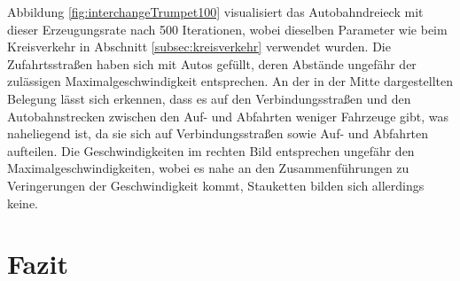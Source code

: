 \documentclass[10pt, a4paper]{article}
\newcommand\myref[1]{\ref{#1} (S. \pageref{#1})}
\newcommand\myrefcomma[1]{\ref{#1}, S. \pageref{#1}}
\begin{document}
Abbildung \ref{fig:interchangeTrumpet100} visualisiert das Autobahndreieck mit dieser Erzeugungsrate nach 500 Iterationen, wobei dieselben Parameter wie beim Kreisverkehr in Abschnitt \ref{subsec:kreisverkehr} verwendet wurden. Die Zufahrtsstraßen haben sich mit Autos gefüllt, deren Abstände ungefähr der zulässigen Maximalgeschwindigkeit entsprechen. An der in der Mitte dargestellten Belegung lässt sich erkennen, dass es auf den Verbindungsstraßen und den Autobahnstrecken zwischen den Auf- und Abfahrten weniger Fahrzeuge gibt, was naheliegend ist, da sie sich auf Verbindungsstraßen sowie Auf- und Abfahrten aufteilen. Die Geschwindigkeiten im rechten Bild entsprechen ungefähr den Maximalgeschwindigkeiten, wobei es nahe an den Zusammenführungen zu Veringerungen der Geschwindigkeit kommt, Stauketten bilden sich allerdings keine.

\newpage
\section{Fazit}
\label{sec:fazit}

\blindtext
\blindtext
\blindtext


{}

\end{document}
